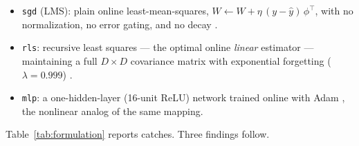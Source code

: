 \documentclass[11pt]{article}
\begin{document}
\begin{itemize}
\item \texttt{sgd} (LMS): plain online least-mean-squares,
  $W \leftarrow W + \eta\,(y - \hat y)\,\phi^\top$, with no normalization, no error gating, and
  no decay \cite{widrow1960}.
\item \texttt{rls}: recursive least squares --- the optimal online \emph{linear} estimator ---
  maintaining a full $D\times D$ covariance matrix with exponential forgetting
  ($\lambda = 0.999$) \cite{plackett1950}.
\item \texttt{mlp}: a one-hidden-layer (16-unit ReLU) network trained online with Adam
  \cite{kingma2015}, the nonlinear analog of the same mapping.
\end{itemize}

Table~\ref{tab:formulation} reports catches. Three findings follow.
\end{document}
